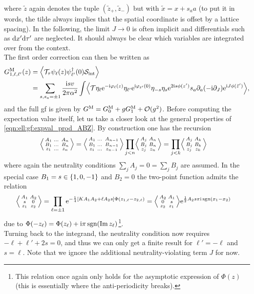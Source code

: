 where $\tilde{z}$ again denotes the tuple $(\tilde{z}_+,\tilde{z}_-)$ but with $\tilde{x} = x + s_aa$ (to put it in words, the tilde always implies that the spatial coordinate is offset by a lattice spacing).
In the following, the limit $J\rightarrow 0$ is often implicit and differentials such as $\d x'\d \tau'$ are neglected.
It should always be clear which variables are integrated over from the context.\\
The first order correction can then be written as
\begin{align*}
G^\M_{1,\ell,\ell'}(z) &= \bra*{\mathcal{T}_\tau \psi_\ell(z) \psi_{\ell'}^\dagger(0) \sact_\tint }\\
&= \sum_{s,s_a=\pm 1} \frac{\i sv}{2\pi\alpha^2} \int \bra*{\mathcal{T} \eta_\ell \powe{-\i\varphi_\ell(z)} \eta_{\ell'} \powe{\i\varphi_{\ell'}(0)} \eta_{-s} \eta_{s}\powe{2\i s\phi(z')} s_a\partial_a (-\i\partial_J) \powe{\i J\phi(\tilde{z}')}},
\end{align*}
and the full \gls{gf} is given by $G^\M = G^\M_0 + gG^\M_1 + \mathcal{O}(g^2)$. 
Before computing the expectation value itself, let us take a closer look at the general properties of \autoref{eqn:ell:gf:expval_prod_ABZ}.
By construction one has the recursion
\begin{align*}
\bra[\Big]{\abx{A_1&\dots&A_n}{B_1&\dots&B_n}{z_1&\dots&z_n}} &= \bra[\Big]{\abx{A_1&\dots&A_{n-1}}{B_1&\dots&B_{n-1}}{z_1&\dots&z_{n-1}}} \prod_{j<n} \bra[\Big]{\abx{A_j&A_n}{B_j&B_n}{z_j&z_n}} = \prod_{j<k} \bra[\Big]{\abx{A_j&A_k}{B_j&B_k}{z_j&z_k}}
\end{align*}
where again the neutrality conditions $\sum_j A_j = 0 = \sum_j B_j$ are assumed.
In the special case $B_1=s\in\klc*{1,0,-1}$ and $B_2=0$ the two-point function admits the relation
\begin{align}
\bra[\Big]{\abx{A_1&A_2}{s&0}{z_1&z_2}} &= \prod_{\ell=\pm 1} \powe{-\frac{1}{4} \klb*{KA_1A_2 + \ell A_2s} \Phi(z_{1,\ell} - z_{2,\ell})} = \bra[\Big]{\abx{A_2&A_1}{0&s}{z_2&z_1}} \powe{\frac{1}{2} A_2s\pi\i\sgn (x_{1} - x_{2})} \label{eqn:ell:gf:expval_AB_sign_swap}
\end{align}
due to $\Phi(-z_\ell) = \Phi(z_\ell) + \i\pi \sgn(\Im z_\ell)$\footnote{This relation once again only holds for the asymptotic expression of $\Phi(z)$ (this is essentially where the anti-periodicity breaks).}.\\
Turning back to the integrand, the neutrality condition now requires $-\ell + \ell' + 2s = 0$, and thus we can only get a finite result for $\ell'=-\ell$ and $s=\ell$.
Note that we ignore the additional neutrality-violating term $J$ for now.
